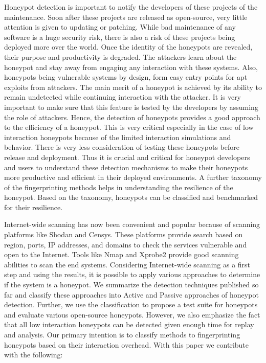 Honeypot detection is important to notify the developers of these projects of the maintenance. Soon after these projects are released as open-source, very little attention is given to updating or patching. While bad maintenance of any software is a huge security risk, there is also a risk of these projects being deployed more over the world. Once the identity of the honeypots are revealed, their purpose and productivity is degraded. The attackers learn about the honeypot and stay away from engaging any interaction with these systems. Also, honeypots being vulnerable systems by design, form easy entry points for \acrshort{apt} exploits from attackers. The main merit of a honeypot is achieved by its ability to remain undetected while continuing interaction with the attacker. It is very important to make sure that this feature is tested by the developers by assuming the role of attackers. Hence, the detection of honeypots provides a good approach to the efficiency of a honeypot. This is very critical especially in the case of low interaction honeypots because of the limited interaction simulations and behavior. There is very less consideration of testing these honeypots before release and deployment. Thus it is crucial and critical for honeypot developers and users to understand these detection mechanisms to make their honeypots more productive and efficient in their deployed environments. A further taxonomy of the fingerprinting methods helps in understanding the resilience of the honeypot. Based on the taxonomy, honeypots can be classified and benchmarked for their resilience. 


Internet-wide scanning has now been convenient and popular because of scanning platforms like Shodan and Censys. These platforms provide search based on region, ports, IP addresses, and domains to check the services vulnerable and open to the Internet. Tools like Nmap and Xprobe2 provide good scanning abilities to scan the end systems\cite{NMap}. Considering Internet-wide scanning as a first step and using the results, it is possible to apply various approaches to determine if the system is a honeypot. We summarize the detection techniques published so far and classify these approaches into Active and Passive approaches of honeypot detection. Further, we use the classification to propose a test suite for honeypots and evaluate various open-source honeypots. However, we also emphasize the fact that all low interaction honeypots can be detected given enough time for replay and analysis. Our primary intention is to classify methods to fingerprinting honeypots based on their interaction overhead. With this paper we contribute with the following:

